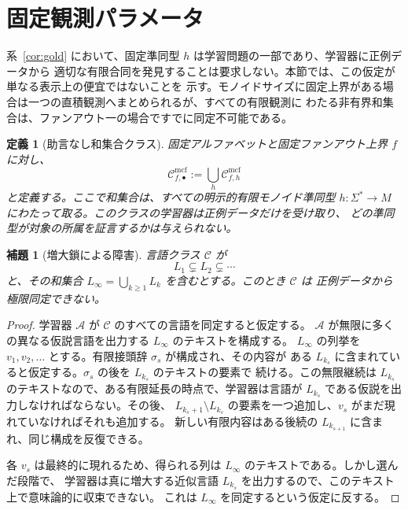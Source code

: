\documentclass[11pt,a4paper]{ltjsarticle}
\newtheorem{lemma}[theorem]{補題}
\newtheorem{definition}[theorem]{定義}
\theoremstyle{remark}
\newcommand{\Cmcf}[2]{\mathcal{C}^{\mathrm{mcf}}_{#1,#2}}
\begin{document}
\section{固定観測パラメータ}
\label{sec:fixed-observation}

系~\ref{cor:gold} において、固定準同型 \(h\) は学習問題の一部であり、学習器に正例データから
適切な有限合同を発見することは要求しない。本節では、この仮定が単なる表示上の便宜ではないことを
示す。モノイドサイズに固定上界がある場合は一つの直積観測へまとめられるが、すべての有限観測に
わたる非有界和集合は、ファンアウト一の場合ですでに同定不可能である。

\begin{definition}[助言なし和集合クラス]
\label{def:no-advice-union}
固定アルファベットと固定ファンアウト上界 \(f\) に対し、
\[
  \Cmcf{f}{\bullet}:=\bigcup_h \Cmcf{f}{h}
\]
と定義する。ここで和集合は、すべての明示的有限モノイド準同型
\(h\colon\Sigma^*\to M\) にわたって取る。このクラスの学習器は正例データだけを受け取り、
どの準同型が対象の所属を証言するかは与えられない。
\end{definition}

\begin{lemma}[増大鎖による障害]
\label{lem:ascending-chain-obstruction}
言語クラス \(\mathcal C\) が
\[
  L_1\subsetneq L_2\subsetneq\cdots
\]
と、その和集合 \(L_\infty=\bigcup_{k\ge1}L_k\) を含むとする。このとき \(\mathcal C\) は
正例データから極限同定できない。
\end{lemma}

\begin{proof}
学習器 \(\mathcal A\) が \(\mathcal C\) のすべての言語を同定すると仮定する。
\(\mathcal A\) が無限に多くの異なる仮説言語を出力する \(L_\infty\) のテキストを構成する。
\(L_\infty\) の列挙を \(v_1,v_2,\ldots\) とする。有限接頭辞 \(\sigma_s\) が構成され、その内容が
ある \(L_{k_s}\) に含まれていると仮定する。\(\sigma_s\) の後を \(L_{k_s}\) のテキストの要素で
続ける。この無限継続は \(L_{k_s}\) のテキストなので、ある有限延長の時点で、学習器は言語が
\(L_{k_s}\) である仮説を出力しなければならない。その後、
\(L_{k_s+1}\setminus L_{k_s}\) の要素を一つ追加し、\(v_s\) がまだ現れていなければそれも追加する。
新しい有限内容はある後続の \(L_{k_{s+1}}\) に含まれ、同じ構成を反復できる。

各 \(v_s\) は最終的に現れるため、得られる列は \(L_\infty\) のテキストである。しかし選んだ段階で、
学習器は真に増大する近似言語 \(L_{k_s}\) を出力するので、このテキスト上で意味論的に収束できない。
これは \(L_\infty\) を同定するという仮定に反する。
\end{proof}
\end{document}
